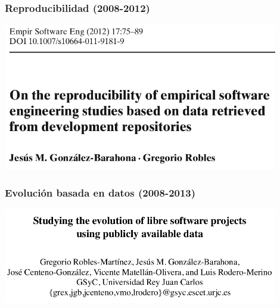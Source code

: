\begin{frame}[fragile]
  \frametitle{Reproducibilidad (2008-2012)}

  \begin{center}
  \includegraphics[width=12cm]{figs/reproducibility}
  \end{center}  
  
\end{frame}

\begin{frame}[fragile]
  \frametitle{Evolución basada en datos (2008-2013)}

  \begin{center}
  \includegraphics[width=12cm]{figs/evolution-data}
  \end{center}  
  
\end{frame}

